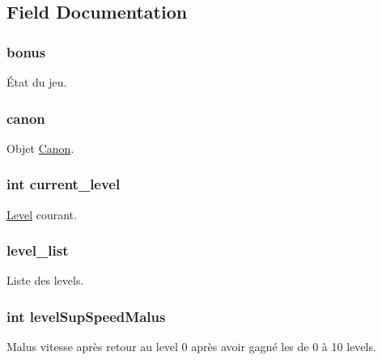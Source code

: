 \subsection{Field Documentation}
\subsubsection[{\texorpdfstring{bonus}{bonus}}]{ bonus}\hypertarget{struct_game_ad9bc80a3bd450dcd9f2c68c2e523051d}{}\label{struct_game_ad9bc80a3bd450dcd9f2c68c2e523051d}
État du jeu. 
\subsubsection[{\texorpdfstring{canon}{canon}}]{ canon}\hypertarget{struct_game_a842d6f5ebfe8dd375e5b03e080622d93}{}\label{struct_game_a842d6f5ebfe8dd375e5b03e080622d93}
Objet \hyperlink{struct_canon}{Canon}. 
\subsubsection[{\texorpdfstring{current\+\_\+level}{current_level}}]{\setlength{\rightskip}{0pt plus 5cm}int current\+\_\+level}\hypertarget{struct_game_aadd67ce7858be05c138c310167fcf663}{}\label{struct_game_aadd67ce7858be05c138c310167fcf663}
\hyperlink{struct_level}{Level} courant. 
\subsubsection[{\texorpdfstring{level\+\_\+list}{level_list}}]{ level\+\_\+list}\hypertarget{struct_game_a592a02fc63fe476f0b4fabe6240a24b8}{}\label{struct_game_a592a02fc63fe476f0b4fabe6240a24b8}
Liste des levels. 
\subsubsection[{\texorpdfstring{level\+Sup\+Speed\+Malus}{levelSupSpeedMalus}}]{\setlength{\rightskip}{0pt plus 5cm}int level\+Sup\+Speed\+Malus}\hypertarget{struct_game_a740c72199e905a6e7b1465e539ce9405}{}\label{struct_game_a740c72199e905a6e7b1465e539ce9405}
Malus vitesse après retour au level 0 après avoir gagné les de 0 à 10 levels. 
